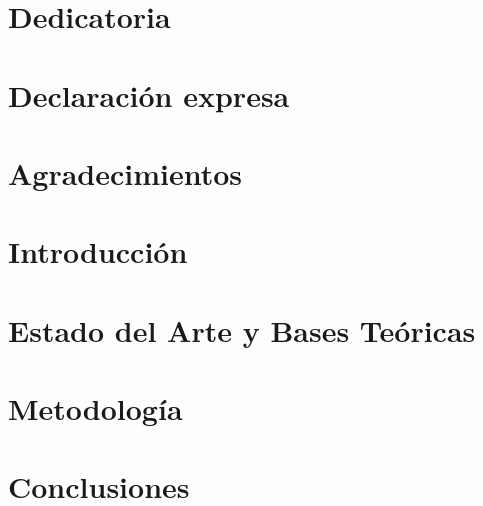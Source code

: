 \documentclass[12pt,twoside]{report}
\begin{document}

        



        \chapter*{Dedicatoria}
        

        \chapter*{Declaración expresa}
        

        \chapter*{Agradecimientos}
        

        \tableofcontents

        \listoffigures

        \printglossaries

        \chapter{Introducción}

        \chapter{Estado del Arte y Bases Teóricas}

        \chapter{Metodología}

        \chapter{Conclusiones}


        

    
\end{document}
